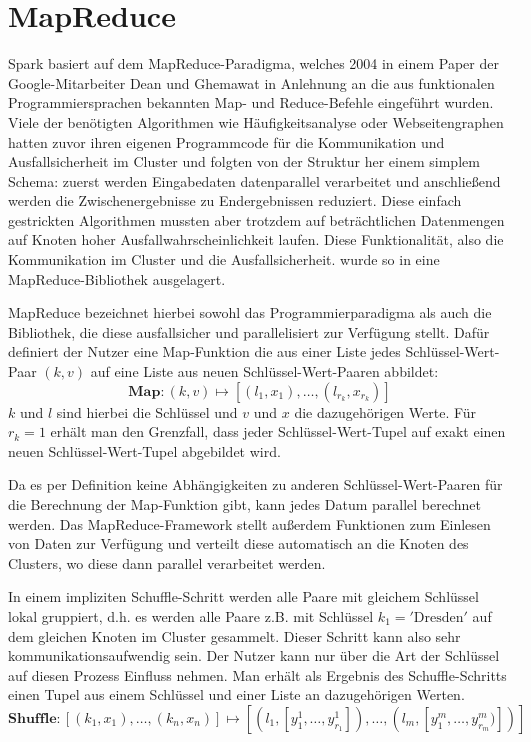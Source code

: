 \section{MapReduce}

Spark basiert auf dem MapReduce-Paradigma, welches 2004 in einem Paper der Google-Mitarbeiter Dean und Ghemawat\cite{mapreduce2004,mapreduce2008} in Anlehnung an die aus funktionalen Programmiersprachen bekannten Map- und Reduce-Befehle eingeführt wurden.
Viele der benötigten Algorithmen wie Häufigkeitsanalyse oder Webseitengraphen hatten zuvor ihren eigenen Programmcode für die Kommunikation und Ausfallsicherheit im Cluster und folgten von der Struktur her einem simplem Schema: zuerst werden Eingabedaten datenparallel verarbeitet und anschließend werden die Zwischenergebnisse zu Endergebnissen reduziert.
Diese einfach gestrickten Algorithmen mussten aber trotzdem auf beträchtlichen Datenmengen auf Knoten hoher Ausfallwahrscheinlichkeit laufen. Diese Funktionalität, also die Kommunikation im Cluster und die Ausfallsicherheit. wurde so in eine MapReduce-Bibliothek ausgelagert.

MapReduce bezeichnet hierbei sowohl das Programmierparadigma als auch die Bibliothek, die diese ausfallsicher und parallelisiert zur Verfügung stellt.
Dafür definiert der Nutzer eine Map-Funktion die aus einer Liste jedes Schlüssel-Wert-Paar $(k,v)$ auf eine Liste aus neuen Schlüssel-Wert-Paaren abbildet:
\begin{equation}
    \mathbf{Map : }\left( k, v \right) \mapsto
    \left[ \left( l_1, x_1 \right), \ldots, \left( l_{r_k}, x_{r_k} \right) \right]
\end{equation}
$k$ und $l$ sind hierbei die Schlüssel und $v$ und $x$ die dazugehörigen Werte. Für $r_k=1$ erhält man den Grenzfall, dass jeder Schlüssel-Wert-Tupel auf exakt einen neuen Schlüssel-Wert-Tupel abgebildet wird.

Da es per Definition keine Abhängigkeiten zu anderen Schlüssel-Wert-Paaren für die Berechnung der Map-Funktion gibt, kann jedes Datum parallel berechnet werden.
Das MapReduce-Framework stellt außerdem Funktionen zum Einlesen von Daten zur Verfügung und verteilt diese automatisch an die Knoten des Clusters, wo diese dann parallel verarbeitet werden.

In einem impliziten Schuffle-Schritt werden alle Paare mit gleichem Schlüssel lokal gruppiert, d.h. es werden alle Paare z.B. mit Schlüssel $k_1=\mathrm{'Dresden'}$ auf dem gleichen Knoten im Cluster gesammelt.
Dieser Schritt kann also sehr kommunikationsaufwendig sein.
Der Nutzer kann nur über die Art der Schlüssel auf diesen Prozess Einfluss nehmen.
Man erhält als Ergebnis des Schuffle-Schritts einen Tupel aus einem Schlüssel und einer Liste an dazugehörigen Werten.
\begin{equation}
    \mathbf{Shuffle :}
    \left[ \left( k_1, x_1 \right), \ldots, \left( k_n, x_n \right) \right]
    \mapsto \left[ \left( l_1, \left[ y^1_1, \ldots, y^1_{r_1} \right] \right), \ldots,
    \left( l_m, \left[ y^m_1, \ldots, y^m_{r_m}) \right] \right) \right]
\end{equation}


